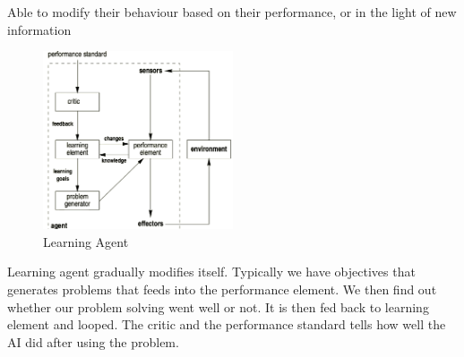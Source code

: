 \documentclass[a4paper]{article}
\theoremstyle{plain}
\theoremstyle{definition}
\newtheorem{defn}{Definition}[section]
\theoremstyle{remark}
\begin{document}
\begin{tcolorbox}[colback=black!3!white,colframe=black!60!white,title=\begin{defn}Learning agents \label{Learning agents}\end{defn}]
Able to modify their behaviour based on their performance, or in the light of new information
\begin{figure}[H]
	\centering
	\includegraphics[width=0.5\textwidth]{8.png}
	\caption{Learning Agent}
	\label{fig:8-png}
\end{figure}
	Learning agent gradually modifies itself. Typically we have objectives that generates problems that feeds into the performance element. We then find out whether our problem solving went well or not. It is then fed back to learning element and looped. The critic and the performance standard tells how well the AI did after using the problem. 
\end{tcolorbox}
\end{document}
